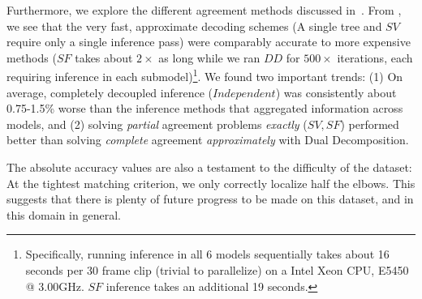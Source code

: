 Furthermore, we explore the different agreement methods discussed 
in~.  From , we see that 
the very fast, approximate decoding schemes (A single tree and $SV$ require 
only a single inference pass) were comparably accurate to more expensive 
methods ($SF$ takes about $2\times$ as long while we ran $DD$ for $500\times$ 
iterations, each requiring inference in each submodel)\footnote{Specifically, 
running inference in all 6 models sequentially takes about 16 seconds per 30 
frame clip (trivial to parallelize) on a Intel Xeon CPU, E5450 @ 3.00GHz.  $SF$ 
inference takes an additional 19 seconds.}. We found two important trends: (1) 
On average, completely decoupled inference ($Independent$) was consistently 
about 0.75-1.5\% worse than the inference methods that aggregated information 
across models, and (2) solving {\em partial} agreement problems {\em exactly} 
($SV, SF$) performed better than solving {\em complete} agreement {\em 
approximately} with Dual Decomposition. 

The absolute accuracy values are also a testament to the difficulty of the 
dataset: At the tightest matching criterion, we only correctly localize half 
the elbows.  This suggests that there is plenty of future progress to be made 
on this dataset, and in this domain in general.


